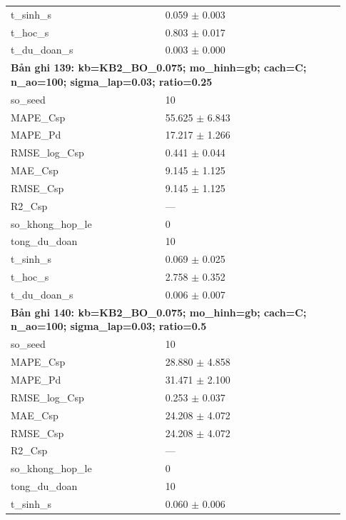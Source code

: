 \begin{longtable}{p{0.43\linewidth}p{0.50\linewidth}}
t\_\allowbreak sinh\_\allowbreak s & 0.059 $\pm$ 0.003 \\
t\_\allowbreak hoc\_\allowbreak s & 0.803 $\pm$ 0.017 \\
t\_\allowbreak du\_\allowbreak doan\_\allowbreak s & 0.003 $\pm$ 0.000 \\
\midrule
\multicolumn{2}{p{0.95\linewidth}}{\textbf{Bản ghi 139: kb=KB2\_BO\_0.075; mo\_hinh=gb; cach=C; n\_ao=100; sigma\_lap=0.03; ratio=0.25}} \\
so\_\allowbreak seed & 10 \\
MAPE\_\allowbreak Csp & 55.625 $\pm$ 6.843 \\
MAPE\_\allowbreak Pd & 17.217 $\pm$ 1.266 \\
RMSE\_\allowbreak log\_\allowbreak Csp & 0.441 $\pm$ 0.044 \\
MAE\_\allowbreak Csp & 9.145 $\pm$ 1.125 \\
RMSE\_\allowbreak Csp & 9.145 $\pm$ 1.125 \\
R2\_\allowbreak Csp & — \\
so\_\allowbreak khong\_\allowbreak hop\_\allowbreak le & 0 \\
tong\_\allowbreak du\_\allowbreak doan & 10 \\
t\_\allowbreak sinh\_\allowbreak s & 0.069 $\pm$ 0.025 \\
t\_\allowbreak hoc\_\allowbreak s & 2.758 $\pm$ 0.352 \\
t\_\allowbreak du\_\allowbreak doan\_\allowbreak s & 0.006 $\pm$ 0.007 \\
\midrule
\multicolumn{2}{p{0.95\linewidth}}{\textbf{Bản ghi 140: kb=KB2\_BO\_0.075; mo\_hinh=gb; cach=C; n\_ao=100; sigma\_lap=0.03; ratio=0.5}} \\
so\_\allowbreak seed & 10 \\
MAPE\_\allowbreak Csp & 28.880 $\pm$ 4.858 \\
MAPE\_\allowbreak Pd & 31.471 $\pm$ 2.100 \\
RMSE\_\allowbreak log\_\allowbreak Csp & 0.253 $\pm$ 0.037 \\
MAE\_\allowbreak Csp & 24.208 $\pm$ 4.072 \\
RMSE\_\allowbreak Csp & 24.208 $\pm$ 4.072 \\
R2\_\allowbreak Csp & — \\
so\_\allowbreak khong\_\allowbreak hop\_\allowbreak le & 0 \\
tong\_\allowbreak du\_\allowbreak doan & 10 \\
t\_\allowbreak sinh\_\allowbreak s & 0.060 $\pm$ 0.006 \\

\end{longtable}
